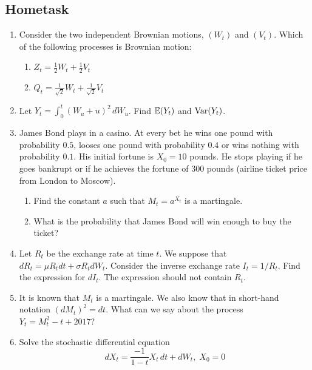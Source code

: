 \documentclass[12pt, a4paper]{article}
\begin{document}
\subsection{Hometask}


\begin{enumerate}

\item Consider the two independent Brownian motions, $(W_t)$ and $(V_t)$. Which of the following processes is Brownian motion:
\begin{enumerate}
\item $Z_t = \frac{1}{2}W_t + \frac{1}{2}V_t$
\item $Q_t = \frac{1}{\sqrt{2}}W_t + \frac{1}{\sqrt{2}}V_t$
\end{enumerate}

\item Let $Y_t = \int_0^t (W_u + u)^2 \, dW_u$. Find $\mathbb{E}(Y_t)$ and $\operatorname{Var}(Y_t)$.

\item James Bond plays in a casino. At every bet he wins one pound with probability $0.5$, looses one pound with probability $0.4$ or wins nothing with probability $0.1$. His initial fortune is $X_0 = 10$ pounds. He stops playing if he goes bankrupt or if he achieves the fortune of $300$ pounds (airline ticket price from London to Moscow).
\begin{enumerate}
\item Find the constant $a$ such that $M_t = a^{X_t}$ is a martingale.
\item What is the probability that James Bond will win enough to buy the ticket?
\end{enumerate}


\item Let $R_t$ be the exchange rate at time $t$. We suppose that $dR_t = \mu R_t dt + \sigma R_t dW_t$. Consider the inverse exchange rate $I_t = 1/R_t$. Find the expression for $dI_t$. The expression should not contain $R_t$.

\item It is known that $M_t$ is a martingale. We also know that in short-hand notation $(dM_t)^2 = dt$. What can we say about the process $Y_t = M_t^2 - t + 2017$?

\item Solve the stochastic differential equation
\begin{equation}
dX_t = \frac{-1}{1 - t}X_t \, dt + dW_t, \; X_0 = 0
\end{equation}


\end{enumerate}
\end{document}
